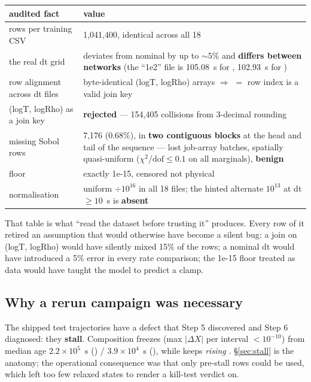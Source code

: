 \begingroup\small
\begin{center}
\begin{tabularx}{\textwidth}{@{}L{4.4cm} Y@{}}
\toprule
\textbf{audited fact} & \textbf{value} \\
\midrule
rows per training CSV & 1,041,400, identical across all 18 \\
the real dt grid & deviates from nominal by up to ${\sim}5\%$ and
  \textbf{differs between networks} (the ``1e2'' file is 105.08~s for
  , 102.93~s for ) \\
row alignment across dt files & byte-identical (logT, logRho) arrays
  $\Rightarrow$  $=$ row index is a valid join key \\
(logT, logRho) as a join key & \textbf{rejected} --- 154,405 collisions from
  3-decimal rounding \\
missing Sobol rows & 7,176 (0.68\%), in \textbf{two contiguous blocks} at the
  head and tail of the sequence --- lost job-array batches, spatially
  quasi-uniform ($\chi^{2}/\mathrm{dof} \le 0.1$ on all marginals),
  \textbf{benign} \\
 floor & exactly 1e-15, censored not physical \\
\epsnu{} normalisation & uniform $\div 10^{16}$ in all 18 files; the hinted
  alternate $10^{13}$ at dt $\ge 10$~s is \textbf{absent} \\
\bottomrule
\end{tabularx}
\end{center}
\endgroup

That table is what ``read the dataset before trusting it'' produces. Every row
of it retired an assumption that would otherwise have become a silent bug: a
join on (logT, logRho) would have silently mixed 15\% of the rows; a nominal dt
would have introduced a 5\% error in every rate comparison; the 1e-15 floor
treated as data would have taught the model to predict a clamp.

\subsection{Why a rerun campaign was necessary}
\label{sec:campaign}

The shipped test trajectories have a defect that Step 5 discovered and Step 6
diagnosed: they \textbf{stall}. Composition freezes (max $|\Delta X|$ per
interval $< 10^{-10}$) from median age $2.2\times10^{5}$~s () /
$3.9\times10^{4}$~s (), while  keeps \emph{rising}
. \S\ref{sec:stall} is the anatomy; the operational
consequence was that only pre-stall rows could be used, which left too few
relaxed states to render a kill-test verdict on.

